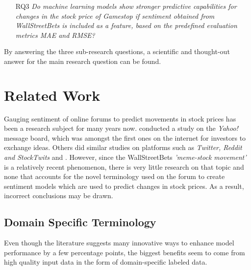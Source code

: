 \documentclass[11pt, a4paper]{article}
\begin{document}
\begin{itemize}
    \item[RQ3] \emph{Do machine learning models show stronger predictive capabilities for changes in the stock price of Gamestop if sentiment obtained from WallStreetBets is included as a feature, based on the predefined evaluation metrics MAE and RMSE?}
\end{itemize}

By answering the three sub-research questions, a scientific and thought-out answer for the main research question can be found.



\section{Related Work}
Gauging sentiment of online forums to predict movements in stock prices has been a research subject for many years now. 
\cite{das2007yahoo} conducted a study on the \emph{Yahoo!} message board, which was amongst the first ones on the internet for investors to exchange ideas.
Others did similar studies on platforms such as \emph{Twitter, Reddit and StockTwits} and \citep{gu2020twtrsentiment, anand2021WallstreetbetsAgainstWallstreet, chousa2017socialmedia}.
However, since the WallStreetBets \emph{'meme-stock movement'} is a relatively recent phenomenon, there is very little research on that topic and none that accounts for the novel
terminology used on the forum to create sentiment models which are used to predict changes in stock prices. As a result, incorrect conclusions may be drawn.

\subsection{Domain Specific Terminology}
Even though the literature suggests many 
innovative ways to enhance model performance by a few percentage points, the biggest benefits seem to come from high quality 
input data in the form of domain-specific labeled data.
\end{document}
